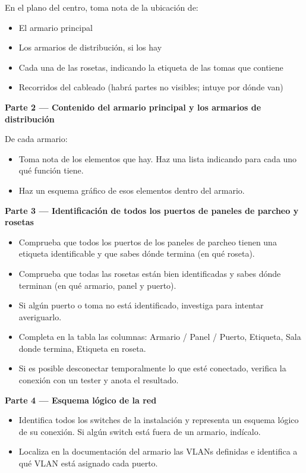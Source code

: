 \documentclass[
  spanish,
  11pt,
  paper=a4,
  ,captions=tableheading
]{scrartcl}
\providecommand{\tightlist}{%
  \setlength{\itemsep}{0pt}\setlength{\parskip}{0pt}}
\begin{document}
En el plano del centro, toma nota de la ubicación de:

\begin{itemize}
\tightlist
\item
  El armario principal
\item
  Los armarios de distribución, si los hay
\item
  Cada una de las rosetas, indicando la etiqueta de las tomas que
  contiene
\item
  Recorridos del cableado (habrá partes no visibles; intuye por dónde
  van)
\end{itemize}

\textbf{Parte 2 --- Contenido del armario principal y los armarios de
distribución}

De cada armario:

\begin{itemize}
\tightlist
\item
  Toma nota de los elementos que hay. Haz una lista indicando para cada
  uno qué función tiene.
\item
  Haz un esquema gráfico de esos elementos dentro del armario.
\end{itemize}

\textbf{Parte 3 --- Identificación de todos los puertos de paneles de
parcheo y rosetas}

\begin{itemize}
\tightlist
\item
  Comprueba que todos los puertos de los paneles de parcheo tienen una
  etiqueta identificable y que sabes dónde termina (en qué roseta).
\item
  Comprueba que todas las rosetas están bien identificadas y sabes dónde
  terminan (en qué armario, panel y puerto).
\item
  Si algún puerto o toma no está identificado, investiga para intentar
  averiguarlo.
\item
  Completa en la tabla las columnas: Armario / Panel / Puerto, Etiqueta,
  Sala donde termina, Etiqueta en roseta.
\item
  Si es posible desconectar temporalmente lo que esté conectado,
  verifica la conexión con un tester y anota el resultado.
\end{itemize}

\textbf{Parte 4 --- Esquema lógico de la red}

\begin{itemize}
\tightlist
\item
  Identifica todos los switches de la instalación y representa un
  esquema lógico de su conexión. Si algún switch está fuera de un
  armario, indícalo.
\item
  Localiza en la documentación del armario las VLANs definidas e
  identifica a qué VLAN está asignado cada puerto.
\end{itemize}
\end{document}
